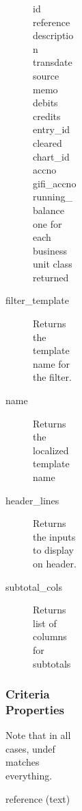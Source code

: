 \begin{description}
\begin{description}
\begin{description}
\begin{description}
\begin{description}
\begin{description}
\begin{description}
\begin{description}
\begin{description}
\begin{description}
\begin{description}
\begin{description}
\item[{id}] \mbox{}
\item[{reference}] \mbox{}
\item[{description}] \mbox{}
\item[{transdate}] \mbox{}
\item[{source}] \mbox{}
\item[{memo}] \mbox{}
\item[{debits}] \mbox{}
\item[{credits}] \mbox{}
\item[{entry\_id}] \mbox{}
\item[{cleared}] \mbox{}
\item[{chart\_id}] \mbox{}
\item[{accno}] \mbox{}
\item[{gifi\_accno}] \mbox{}
\item[{running\_balance}] \mbox{}
\item[{one for each business unit class returned}] \mbox{}\end{description}

\item[{filter\_template}] \mbox{}

Returns the template name for the filter.


\item[{name}] \mbox{}

Returns the localized template name


\item[{header\_lines}] \mbox{}

Returns the inputs to display on header.


\item[{subtotal\_cols}] \mbox{}

Returns list of columns for subtotals

\end{description}
\subsubsection*{Criteria Properties\label{LedgerSMB::DBObject::Report::GL_Criteria_Properties}}


Note that in all cases, undef matches everything.

\begin{description}

\item[{reference (text)}] \mbox{}


\end{description}
\end{description}
\end{description}
\end{description}
\end{description}
\end{description}
\end{description}
\end{description}
\end{description}
\end{description}
\end{description}
